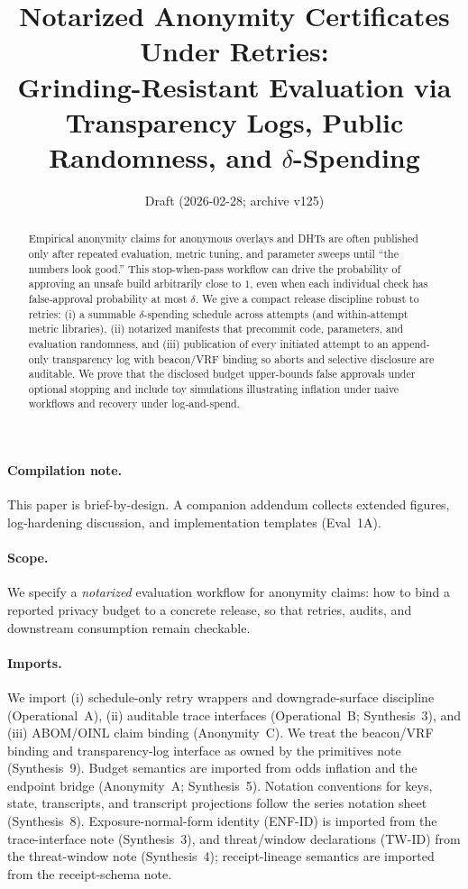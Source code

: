 \documentclass[11pt]{article}
\title{Notarized Anonymity Certificates Under Retries:\\
Grinding-Resistant Evaluation via Transparency Logs, Public Randomness, and \texorpdfstring{$\delta$}{delta}-Spending}
\author{}
\date{Draft (2026-02-28; archive v125)}
\begin{document}
\maketitle

\begin{abstract}
Empirical anonymity claims for anonymous overlays and DHTs are often published only after repeated evaluation, metric tuning, and parameter sweeps until ``the numbers look good.''
This stop-when-pass workflow can drive the probability of approving an unsafe build arbitrarily close to $1$, even when each individual check has false-approval probability at most $\delta$.
We give a compact release discipline robust to retries: (i) a summable $\delta$-spending schedule across attempts (and within-attempt metric libraries), (ii) notarized manifests that precommit code, parameters, and evaluation randomness, and (iii) publication of every initiated attempt to an append-only transparency log with beacon/VRF binding so aborts and selective disclosure are auditable.
We prove that the disclosed budget upper-bounds false approvals under optional stopping and include toy simulations illustrating inflation under naive workflows and recovery under log-and-spend.
\end{abstract}

\paragraph{Compilation note.}
This paper is brief-by-design. A companion addendum collects extended figures, log-hardening discussion, and implementation templates (Eval~1A).\cite{series:evalnotaryaddendum}

\paragraph{Scope.}
We specify a \emph{notarized} evaluation workflow for anonymity claims: how to bind a reported privacy budget to a concrete release, so that retries, audits, and downstream consumption remain checkable.

\paragraph{Imports.}
We import (i) schedule-only retry wrappers and downgrade-surface discipline (Operational~A), (ii) auditable trace interfaces (Operational~B; Synthesis~3), and (iii) ABOM/OINL claim binding (Anonymity~C). We treat the beacon/VRF binding and transparency-log interface as owned by the primitives note (Synthesis~9).\cite{series:transparencyprimitives}
Budget semantics are imported from odds inflation and the endpoint bridge (Anonymity~A; Synthesis~5).\cite{series:oddsinflation,series:endpointbridge,series:abomoinl}
Notation conventions for keys, state, transcripts, and transcript projections follow the series notation sheet (Synthesis~8). Exposure-normal-form identity (ENF-ID) is imported from the trace-interface note (Synthesis~3), and threat/window declarations (TW-ID) from the threat-window note (Synthesis~4); receipt-lineage semantics are imported from the receipt-schema note.\cite{series:notation,series:traceifaces,series:threatwindows,series:receiptitems}
\end{document}
